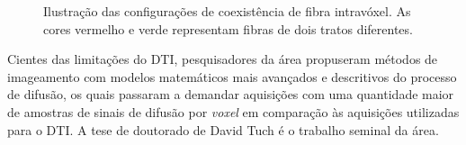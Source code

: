 \documentclass[
    12pt,                %
    oneside,            %
    a4paper,            %
    english,            %
    french,                %
    spanish,            %
    brazil                %
    ]{abntex2}
\begin{document}
\begin{figure}[ht]
\centering
\captionsetup[subfloat]{farskip=0pt,nearskip=0pt}
    \caption{Ilustração das configurações de coexistência de fibra intravóxel. As cores vermelho e verde representam fibras de dois tratos diferentes.}
    \label{fig::intro_config}
\end{figure}

Cientes das limitações do DTI, pesquisadores da área propuseram métodos de imageamento com modelos matemáticos mais avançados e descritivos do processo de difusão, os quais passaram a demandar aquisições
com uma quantidade maior de amostras de sinais de difusão por \textit{voxel} em comparação às aquisições utilizadas para o DTI. %
A tese de doutorado de David Tuch \cite{tuch2002} é o trabalho seminal da área.
\end{document}
